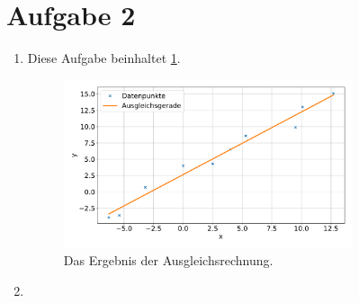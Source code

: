 \section*{Aufgabe 2}

\begin{enumerate}[label=\alph*)]
    \item   Diese Aufgabe beinhaltet \ref{fig:ausgleich}.
            \begin{figure}
                \centering
                \includegraphics[width=0.8\textwidth]{../bin/figure.pdf}
            \caption{Das Ergebnis der Ausgleichsrechnung.}
            \label{fig:ausgleich}
            \end{figure}
    \item 
\end{enumerate}